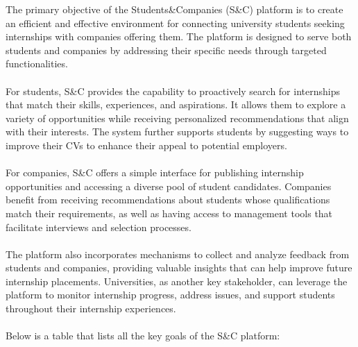 The primary objective of the Students\&Companies (S\&C) platform is to create an efficient and effective environment for connecting university students seeking internships with companies offering them. The platform is designed to serve both students and companies by addressing their specific needs through targeted functionalities. \\ \\
For students, S\&C provides the capability to proactively search for internships that match their skills, experiences, and aspirations. It allows them to explore a variety of opportunities while receiving personalized recommendations that align with their interests. The system further supports students by suggesting ways to improve their CVs to enhance their appeal to potential employers. \\ \\
For companies, S\&C offers a simple interface for publishing internship opportunities and accessing a diverse pool of student candidates. Companies benefit from receiving recommendations about students whose qualifications match their requirements, as well as having access to management tools that facilitate interviews and selection processes. \\ \\
The platform also incorporates mechanisms to collect and analyze feedback from students and companies, providing valuable insights that can help improve future internship placements. Universities, as another key stakeholder, can leverage the platform to monitor internship progress, address issues, and support students throughout their internship experiences. \\ \\
Below is a table that lists all the key goals of the S\&C platform:
